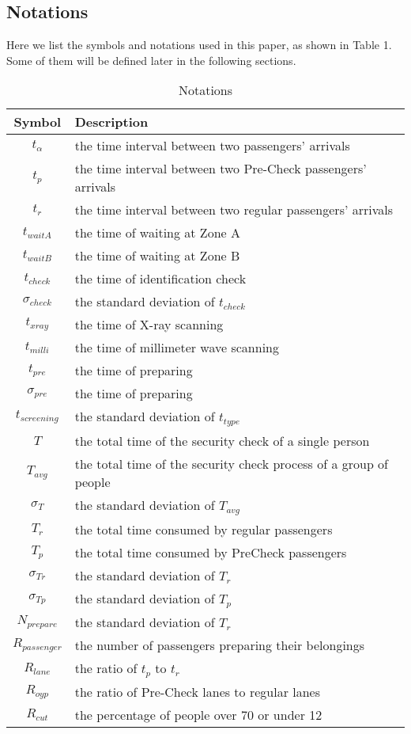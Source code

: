 \documentclass{mcmthesis}
\begin{document}
\begin{itemize}
\end{itemize}



\subsection{Notations}
\par Here we list the symbols and notations used in this paper, as shown in Table 1. Some
of them will be defined later in the following sections.


\begin{table}
\begin{center}
\caption{Notations}
\begin{tabular}{cl}
\toprule
Symbol & Description \\%
\midrule
$t_\alpha$ & the time interval between two passengers' arrivals\\
$t_p$ & the time interval between two Pre-Check passengers' arrivals \\
$t_r$ & the time interval between two regular passengers' arrivals\\
$t_{waitA}$ & the time of waiting at Zone A\\
$t_{waitB}$ & the time of waiting at Zone B\\
$t_{check}$ & the time of identification check\\
$\sigma _{check}$ & the standard deviation of $t_{check}$\\
$t_{xray}$ & the time of X-ray scanning \\
$t_{milli}$ & the time of millimeter wave scanning\\
$t_{pre}$ & the time of preparing\\
$\sigma _{pre}$ &the time of preparing \\
$t_{screening}$ & the standard deviation of $t_{type}$\\
$T$ &the total time of the security check of a single person \\
$T_{avg}$ & the total time of the security check process of a group of people\\
$\sigma_{T}$ & the standard deviation of $T_{avg}$\\
$T_{r}$ & the total time consumed by regular passengers\\
$T_{p}$ & the total time consumed by PreCheck passengers\\
$\sigma_{Tr}$ & the standard deviation of $T_{r}$\\
$\sigma_{Tp}$& the standard deviation of $T_{p}$\\
$N_{prepare}$ &the standard deviation of $T_{r}$ \\
$R_{passenger}$ & the number of passengers preparing their belongings\\
$R_{lane}$ & the ratio of $t_{p}$ to $t_{r}$ \\
$R_{oyp}$ & the ratio of Pre-Check lanes to regular lanes \\
$R_{cut}$ & the percentage of people over 70 or under 12\\
\bottomrule
\end{tabular}
\end{center}
\end{table}
\end{document}
